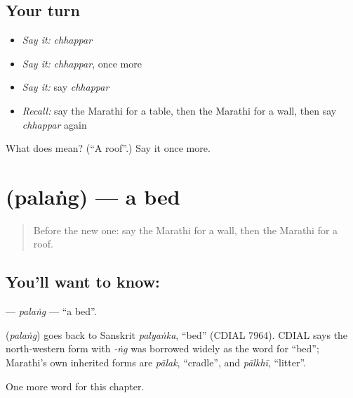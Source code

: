 \subsection*{Your turn}
\begin{itemize}
\raggedright
  \item \emph{Say it:} \emph{chhappar}
  \item \emph{Say it:} \emph{chhappar}, once more
  \item \emph{Say it:} say \emph{chhappar}
  \item \emph{Recall:} say the Marathi for a table, then the Marathi for a wall, then say \emph{chhappar} again
\end{itemize}

\begin{tcolorbox}[breakable,colback=teal!4,colframe=teal!35!black,title={Before you move on}]
What does  mean? (\textquotedblleft{}A roof\textquotedblright{}.) Say it once more.
\end{tcolorbox}
\section[\texorpdfstring{\mr{पलंग} (palaṅg)}{पलंग (palaṅg)}]{ (palaṅg) — a bed}

\label{lesson:MR-C90-palang}



\begin{quote}
Before the new one: say the Marathi for a wall, then the Marathi for a roof.
\end{quote}

\subsection*{You'll want to know: }
\textbf{} — \emph{palaṅg} — \textquotedblleft{}a bed\textquotedblright{}.

\begin{cousinweb}
\textbf{} (\emph{palaṅg}) goes back to Sanskrit \emph{palyaṅka}, \textquotedblleft{}bed\textquotedblright{} (CDIAL 7964). CDIAL says the north-western form with \emph{-ṅg} was borrowed widely as the word for \textquotedblleft{}bed\textquotedblright{}; Marathi's own inherited forms are \emph{pālak}, \textquotedblleft{}cradle\textquotedblright{}, and \emph{pālkhī}, \textquotedblleft{}litter\textquotedblright{}.
\end{cousinweb}

\begin{grammarlens}[title={What you've built}]
One more word for this chapter.
\end{grammarlens}

